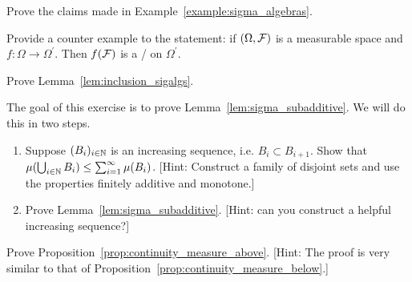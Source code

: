 \begin{problem}\label{prb:example_sigalgs}
Prove the claims made in Example~\ref{example:sigma_algebras}.
\end{problem}

\begin{problem}\label{prb:converse_preimage_sigma_algebra}
Provide a counter example to the statement: if $(\Omega, \mathcal F)$ is a measurable space and $f : \Omega \to \Omega^\prime$. Then $f(\mathcal F)$ is a \sigalg/ on $\Omega^\prime$.
\end{problem}

\begin{problem}\label{prb:inclusion_sigalgs}
Prove Lemma~\ref{lem:inclusion_sigalgs}.
\end{problem}

\begin{problem}\label{prb:sigma_subadditive}
The goal of this exercise is to prove Lemma~\ref{lem:sigma_subadditive}. We will do this in two steps. 
\begin{enumerate}
\item Suppose $(B_i)_{i \in \mathbb N}$ is an increasing sequence, i.e. $B_i \subset B_{i +1}$. Show that $\mu(\bigcup_{i \in \mathbb N} B_i) \le \sum_{i = 1}^\infty \mu(B_i)$. [Hint: Construct a family of disjoint sets and use the properties finitely additive and monotone.]
\item Prove Lemma~\ref{lem:sigma_subadditive}. [Hint: can you construct a helpful increasing sequence?]
\end{enumerate}  
\end{problem}

\begin{problem}\label{prb:proof_continuity_above}
Prove Proposition~\ref{prop:continuity_measure_above}. [Hint: The proof is very similar to that of Proposition~\ref{prop:continuity_measure_below}.]
\end{problem}

